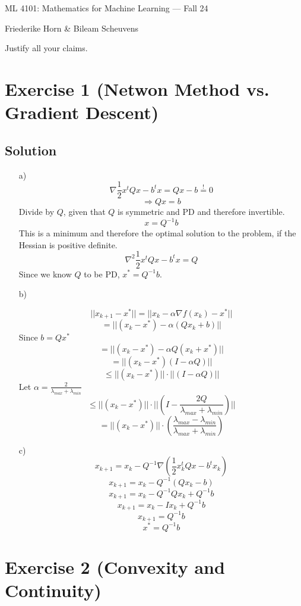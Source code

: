 \documentclass[10pt]{article}
\numberwithin{equation}{section}
\begin{document}
\begin{center}
    \sc ML 4101: Mathematics for Machine Learning --- Fall 24
\end{center}

\noindent Friederike Horn \& Bileam Scheuvens

Justify all your claims.
\section*{Exercise 1 (Netwon Method vs. Gradient Descent)}

\subsection*{Solution}

\begin{enumerate}
\item[a)]{
    $$\nabla \frac{1}{2} x^t Qx - b^t x = Qx - b \overset{!}{=} 0$$
    $$ \Rightarrow Qx = b$$
    Divide by $Q$, given that $Q$ is symmetric and PD and therefore invertible.
    $$ x = Q^{-1}b$$
    This is a minimum and therefore the optimal solution to the problem, if the Hessian is positive definite.
    $$\nabla^2 \frac{1}{2} x^t Qx - b^t x = Q$$
    Since we know $Q$ to be PD, $x^* = Q^{-1}b$.
  }

\item[b)] {
    $$||x_{k+1} - x^*|| = ||x_k - \alpha \nabla f(x_k) - x^* ||$$
    $$ = ||(x_k - x^*)  - \alpha (Qx_k + b) ||$$
    Since $b = Qx^*$
    $$= ||(x_k - x^*) - \alpha Q (x_k + x^*) ||$$
    $$= ||(x_k - x^*) (I - \alpha Q)  ||$$
$$\leq ||(x_k - x^*)||\cdot ||(I - \alpha Q)  ||$$
    Let $\alpha = \frac{2}{\lambda_{max} + \lambda_{min}}$
    $$\leq ||(x_k - x^*)||\cdot ||(I - \frac{2Q}{\lambda_{max} + \lambda_{min}})  ||$$
$$= ||(x_k - x^*)||\cdot \left(\frac{\lambda_{max} - \lambda_{min}}{\lambda_{max} + \lambda_{min}}\right)$$

  }
\item[c)] {
    $$x_{k+1} = x_k - Q^{-1}\nabla (\frac{1}{2} x_k^t Qx - b^t x_k)$$
  $$x_{k+1} = x_k - Q^{-1}(Qx_k - b)$$
  $$x_{k+1} = x_k - Q^{-1}Qx_k + Q^{-1}b$$
  $$x_{k+1} = x_k - Ix_k + Q^{-1}b$$
  $$x_{k+1} = Q^{-1}b$$
  $$x^* = Q^{-1}b$$
}
\end{enumerate}
\section*{Exercise 2 (Convexity and Continuity)}
\end{document}
